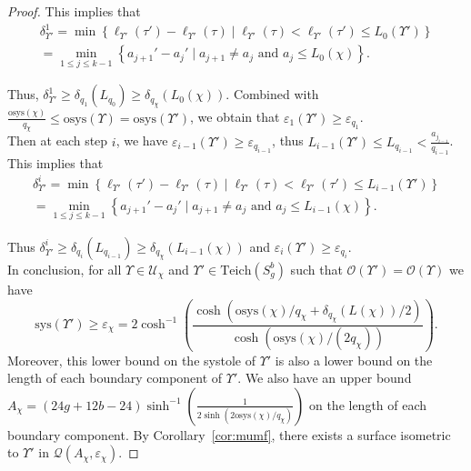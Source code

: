 \documentclass[a4paper,12pt]{article}
\theoremstyle{definition}
\theoremstyle{remark}
\begin{document}
\begin{proof}
    This implies that
    \begin{multline*}
        \delta_{\Upsilon'}^1= \min\left\{\ell_{\Upsilon'}(\tau') - \ell_{\Upsilon'}(\tau) \mid \ell_{\Upsilon'}(\tau) < \ell_{\Upsilon'}(\tau') \leqslant L_0(\Upsilon') \right\} \\
        = \min_{1 \leqslant j \leqslant k-1}\left\{a_{j+1}'-a_j' \mid a_{j+1}\neq a_j \mbox{ and } a_j \leqslant L_0(\chi)\right\}.
    \end{multline*}

    Thus, $\delta_{\Upsilon'}^1  \geqslant \delta_{q_{1}}(L_{q_0}) \geqslant \delta_{q_\chi}(L_0(\chi))$. Combined with $ \frac{\mathrm{osys}(\chi)}{q_\chi} \leqslant  \mathrm{osys}(\Upsilon)=\mathrm{osys}(\Upsilon')$, we obtain that $\varepsilon_{1}(\Upsilon') \geqslant \varepsilon_{q_{1}}$.\\
    
    Then at each step $i$, we have $\varepsilon_{i-1}(\Upsilon') \geqslant \varepsilon_{q_{i-1}}$, thus $ L_{i-1}(\Upsilon') \leqslant L_{q_{i-1}} < \frac{a_{j_{i-1}}}{q_{i-1}}$. This implies that
    \begin{multline*}
        \delta_{\Upsilon'}^{i}= \min\left\{\ell_{\Upsilon'}(\tau') - \ell_{\Upsilon'}(\tau) \mid \ell_{\Upsilon'}(\tau) < \ell_{\Upsilon'}(\tau') \leqslant L_{i-1}(\Upsilon') \right\} \\ 
        = \min_{1 \leqslant j \leqslant k-1}\left\{a_{j+1}'-a_j' \mid a_{j+1}\neq a_j \mbox{ and } a_j \leqslant L_{i-1}(\chi)\right\}.
    \end{multline*}
    
    Thus $\delta_{\Upsilon'}^{i} \geqslant \delta_{q_{i}}(L_{q_{i-1}}) \geqslant \delta_{q_\chi}(L_{i-1}(\chi))$ and  $\varepsilon_{i}(\Upsilon') \geqslant \varepsilon_{q_{i}}$.\\
    
    In conclusion, for all $\Upsilon \in \mathcal{U}_\chi$ and $\Upsilon' \in \mathrm{Teich}(S_g^b)$ such that $\mathcal{O}(\Upsilon')=\mathcal{O}(\Upsilon)$ we have
    \[
        \mathrm{sys}(\Upsilon') \geqslant \varepsilon_\chi = 2\cosh^{-1} \left( \frac{   \cosh(\mathrm{osys}(\chi)/q_\chi + \delta_{q_\chi}(L(\chi))/2 )}{  \cosh( \mathrm{osys}(\chi)/(2q_\chi) )} \right).
    \]
    Moreover, this lower bound on the systole of $\Upsilon'$ is also a lower bound on the length of each boundary component of $\Upsilon'$. We also have an upper bound $A_\chi=(24g+12b-24) \sinh^{-1}\left( \frac{1}{2\sinh(2 \mathrm{osys}(\chi)/q_\chi)} \right)$ on the length of each boundary component. By Corollary~\ref{cor:mumf}, there exists a surface isometric to $\Upsilon'$ in $\mathcal{Q}(A_\chi,\varepsilon_\chi)$.
\end{proof}
\end{document}
